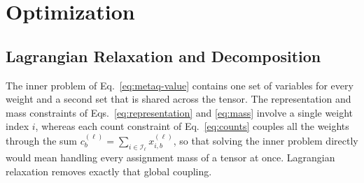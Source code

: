 \documentclass{article}
\begin{document}
\section{Optimization}
\label{sec:optimization}

\subsection{Lagrangian Relaxation and Decomposition}
\label{sec:lagrangian-decomposition}

The inner problem of Eq.~\eqref{eq:metaq-value} contains one set of variables for
every weight and a second set that is shared across the tensor. The
representation and mass constraints of Eqs.~\eqref{eq:representation} and
\eqref{eq:mass} involve a single weight index $i$, whereas each count constraint
of Eq.~\eqref{eq:counts} couples all the weights through the sum
$c_b^{(\ell)}=\sum_{i\in\mathcal I_\ell}x_{i,b}^{(\ell)}$, so that solving the
inner problem directly would mean handling every assignment mass of a tensor at
once. Lagrangian relaxation removes exactly that global coupling.
\end{document}

